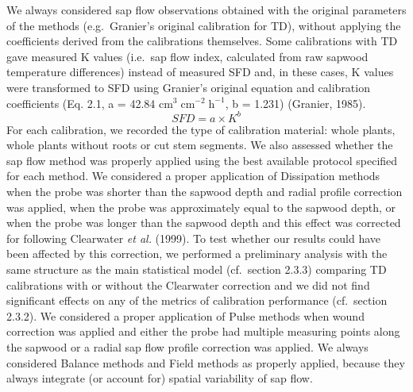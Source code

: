 \documentclass[11pt,twoside]{reedthesis}
\begin{document}
We always considered sap flow observations obtained with the original
parameters of the methods (e.g.~Granier's original calibration for TD),
without applying the coefficients derived from the calibrations
themselves. Some calibrations with TD gave measured K values (i.e.~sap
flow index, calculated from raw sapwood temperature differences) instead
of measured SFD and, in these cases, K values were transformed to SFD
using Granier's original equation and calibration coefficients (Eq. 2.1,
a = 42.84 \(\text{cm}^3\; \text{cm}^{-2}\; \text{h}^{-1}\), b = 1.231)
(Granier, 1985).
\begin{equation}
SFD = a\times K^b
\end{equation}
For each calibration, we recorded the type of calibration material:
whole plants, whole plants without roots or cut stem segments. We also
assessed whether the sap flow method was properly applied using the best
available protocol specified for each method. We considered a proper
application of Dissipation methods when the probe was shorter than the
sapwood depth and radial profile correction was applied, when the probe
was approximately equal to the sapwood depth, or when the probe was
longer than the sapwood depth and this effect was corrected for
following Clearwater \emph{et al.} (1999). To test whether our results
could have been affected by this correction, we performed a preliminary
analysis with the same structure as the main statistical model
(cf.~section 2.3.3) comparing TD calibrations with or without the
Clearwater correction and we did not find significant effects on any of
the metrics of calibration performance (cf.~section 2.3.2). We
considered a proper application of Pulse methods when wound correction
was applied and either the probe had multiple measuring points along the
sapwood or a radial sap flow profile correction was applied. We always
considered Balance methods and Field methods as properly applied,
because they always integrate (or account for) spatial variability of
sap flow.\par
\end{document}
